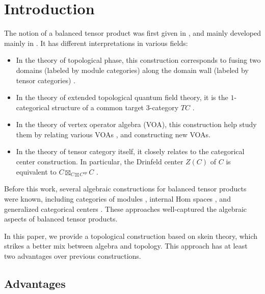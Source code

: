 \section{Introduction}

The notion of a balanced tensor product was first given in
\cite{etingof/fusion-cat-and-homotopy}, and mainly developed mainly in
\cite{douglas/balanced-product}. It has different interpretations in various
fields:
\begin{itemize}
  \item In the theory of topological phase, this construction corresponds to
        fusing two domains (labeled by module categories) along the domain
        wall (labeled by tensor categories) \cite{kong/topological-order}.
  \item In the theory of extended topological quantum field theory, it is the
        $1$-categorical structure of a common target $3$-category $TC$
        \cite{douglas/dualizable-tensor-categories}.
  \item In the theory of vertex operator algebra (VOA), this construction help
        study them by relating various VOAs \cite{gannon/sln-II}, and
        constructing new VOAs. %
  \item In the theory of tensor category itself, it closely relates to the
        categorical center construction. In particular, the Drinfeld center
        $Z(C)$ of $C$ is equivalent to $C \boxtimes_{C \boxtimes C^{op}} C$
        \cite{kirillov/string-net-tv}
        \cite{douglas/dualizable-tensor-categories}.
\end{itemize}

Before this work, several algebraic constructions for balanced tensor products
were known, including categories of modules \cite{douglas/balanced-product},
internal Hom spaces \cite{davydov/picard}, and generalized categorical centers
\cite{etingof/fusion-cat-and-homotopy} \cite{kirillov/fact-homo-4d-tqft}
\cite{hoek/master}. These approaches well-captured the algebraic aspects of
balanced tensor products.

In this paper, we provide a topological construction based on skein theory,
which strikes a better mix between algebra and topology. This approach has at
least two advantages over previous constructions.

\subsection{Advantages}

